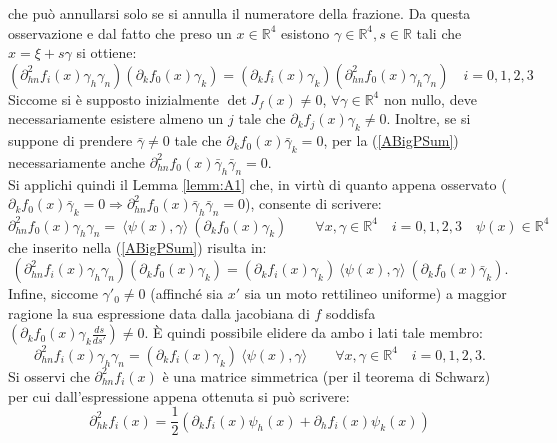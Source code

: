 che può annullarsi solo se si annulla il numeratore della frazione. Da questa osservazione e dal fatto che preso un $x\in \mathbb{R}^4 $ esistono $ \gamma \in\mathbb{R}^4, s \in \mathbb{R}$ tali che $x=\xi+s\gamma$ si ottiene:
\begin{equation}
    \left(\partial^2_{hn}f_i(x)\gamma_h\gamma_n\right)\left(\partial_kf_0(x)\gamma_k\right)
    = \left(\partial_kf_i(x)\gamma_k\right)\left(\partial^2_{hn}f_0(x)\gamma_h\gamma_n\right) \quad i=0,1,2,3  
    \label{ABigPSum}
\end{equation}
Siccome si è supposto inizialmente $\det J_f(x)\neq 0$, $ \forall\gamma\in \mathbb{R}^4$ non nullo, deve necessariamente esistere almeno un $j$ tale che $\partial_kf_j(x)\gamma_k\neq 0$. Inoltre, se si suppone di prendere $\bar{\gamma}\neq0$ tale che $\partial_kf_0(x)\bar{\gamma}_k=0$, per la (\ref{ABigPSum}) necessariamente anche $\partial^2_{hn}f_0(x)\bar{\gamma}_h\bar{\gamma}_n=0$.\\

Si applichi quindi il Lemma \ref{lemm:A1} che, in virtù di quanto appena osservato ($\partial_kf_0(x)\bar{\gamma}_k=0\Rightarrow \partial^2_{hn}f_0(x)\bar{\gamma}_h\bar{\gamma}_n=0$), consente di scrivere:
\begin{equation*}
    \partial^2_{hn}f_0(x)\gamma_h\gamma_n=\ \langle \psi(x),\gamma\rangle\ (\partial_kf_0(x)\gamma_k) \qquad   \forall x,\gamma\in \mathbb{R}^4 \quad i=0,1,2,3 \quad \psi(x)\in\mathbb{R}^4
\end{equation*}
che inserito nella (\ref{ABigPSum}) risulta in:
\begin{equation*}
    \left(\partial^2_{hn}f_i(x)\gamma_h\gamma_n\right)\left(\partial_kf_0(x)\gamma_k\right)
    = \left(\partial_kf_i(x)\gamma_k\right)\ \langle \psi(x),\gamma\rangle\ (\partial_kf_0(x)\bar{\gamma}_k).
\end{equation*}
Infine, siccome $\gamma'_0\neq 0$ (affinché sia $x'$ sia un moto rettilineo uniforme) a maggior ragione la sua espressione data dalla jacobiana di $f$ soddisfa $(\partial_kf_0(x)\gamma_k\frac{ds}{ds'})\neq 0$. È quindi possibile elidere da ambo i lati tale membro:
\begin{equation}
    \partial^2_{hn}f_i(x)\gamma_h\gamma_n=\left(\partial_kf_i(x)\gamma_k\right)\ \langle \psi(x),\gamma\rangle \qquad   \forall x,\gamma\in \mathbb{R}^4 \quad i=0,1,2,3.
    \label{APArtialScal}
\end{equation}
Si osservi che  $\partial^2_{hn}f_i(x)$ è una matrice simmetrica (per il teorema di Schwarz) per cui dall'espressione appena ottenuta si può scrivere:
\begin{equation}
    \partial^2_{hk}f_i(x)=\frac{1}{2}\left(\partial_kf_i(x)\psi_h(x)+\partial_hf_i(x)\psi_k(x)\right)
    \label{APArtialScalSimm}
\end{equation}

